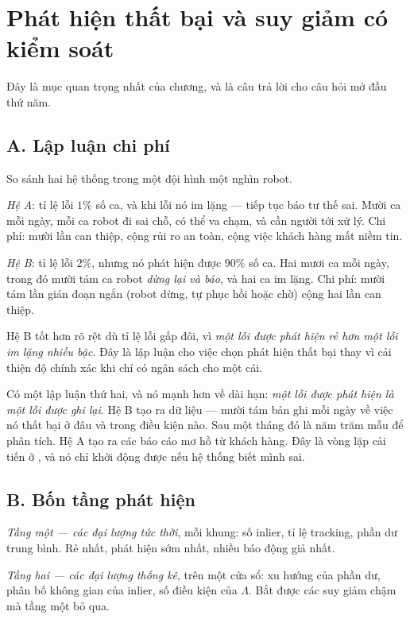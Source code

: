 \documentclass[../../vslam.tex]{subfiles}
\begin{document}
\section{Phát hiện thất bại và suy giảm có kiểm soát}

Đây là mục quan trọng nhất của chương, và là câu trả lời cho câu hỏi mở đầu thứ năm.

\subsection{A. Lập luận chi phí}

So sánh hai hệ thống trong một đội hình một nghìn robot.

\emph{Hệ A}: tỉ lệ lỗi \(1\%\) số ca, và khi lỗi nó im lặng --- tiếp tục báo tư thế sai. Mười ca mỗi ngày, mỗi ca robot đi sai chỗ, có thể va chạm, và cần người tới xử lý. Chi phí: mười lần can thiệp, cộng rủi ro an toàn, cộng việc khách hàng mất niềm tin.

\emph{Hệ B}: tỉ lệ lỗi \(2\%\), nhưng nó phát hiện được \(90\%\) số ca. Hai mươi ca mỗi ngày, trong đó mười tám ca robot \emph{dừng lại và báo}, và hai ca im lặng. Chi phí: mười tám lần gián đoạn ngắn (robot dừng, tự phục hồi hoặc chờ) cộng hai lần can thiệp.

Hệ B tốt hơn rõ rệt dù tỉ lệ lỗi gấp đôi, vì \emph{một lỗi được phát hiện rẻ hơn một lỗi im lặng nhiều bậc}. Đây là lập luận cho việc chọn phát hiện thất bại thay vì cải thiện độ chính xác khi chỉ có ngân sách cho một cái.

Có một lập luận thứ hai, và nó mạnh hơn về dài hạn: \emph{một lỗi được phát hiện là một lỗi được ghi lại}. Hệ B tạo ra dữ liệu --- mười tám bản ghi mỗi ngày về việc nó thất bại ở đâu và trong điều kiện nào. Sau một tháng đó là năm trăm mẫu để phân tích. Hệ A tạo ra các báo cáo mơ hồ từ khách hàng. Đây là vòng lặp cải tiến ở , và nó chỉ khởi động được nếu hệ thống biết mình sai.

\subsection{B. Bốn tầng phát hiện}

\emph{Tầng một --- các đại lượng tức thời}, mỗi khung: số inlier, tỉ lệ tracking, phần dư trung bình. Rẻ nhất, phát hiện sớm nhất, nhiều báo động giả nhất.

\emph{Tầng hai --- các đại lượng thống kê}, trên một cửa sổ: xu hướng của phần dư, phân bố không gian của inlier, số điều kiện của \(\Lambda\). Bắt được các suy giảm chậm mà tầng một bỏ qua.
\end{document}
